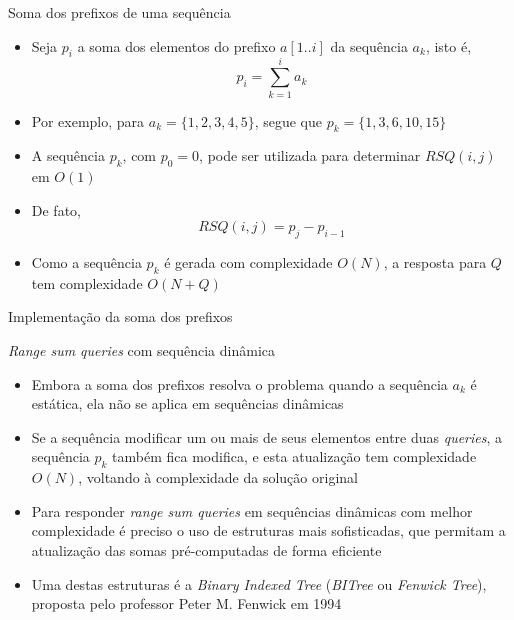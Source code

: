 \begin{frame}[fragile]{Soma dos prefixos de uma sequência}

    \begin{itemize}
        \item Seja $p_i$ a soma dos elementos do prefixo $a[1..i]$ da sequência $a_k$, isto é,
        \[
            p_i = \sum_{k = 1}^i a_k
        \]

        \item Por exemplo, para $a_k = \lbrace 1, 2, 3, 4, 5\rbrace$, segue que
            $p_k = \lbrace 1, 3, 6, 10, 15\rbrace$

        \item A sequência $p_k$, com $p_0 = 0$, pode ser utilizada para determinar $RSQ(i, j)$
            em $O(1)$

        \item De fato,
        \[
            RSQ(i, j) = p_j - p_{i - 1}
        \]

        \item Como a sequência $p_k$ é gerada com complexidade $O(N)$, a resposta para $Q$ tem
            complexidade $O(N + Q)$
    \end{itemize}

\end{frame}

\begin{frame}[fragile]{Implementação da soma dos prefixos}
\end{frame}

\begin{frame}[fragile]{\textit{Range sum queries} com sequência dinâmica}

    \begin{itemize}
        \item Embora a soma dos prefixos resolva o problema quando a sequência $a_k$ é 
            estática, ela não se aplica em sequências dinâmicas

        \item Se a sequência modificar um ou mais de seus elementos entre duas \textit{queries},
            a sequência $p_k$ também fica modifica, e esta atualização tem complexidade $O(N)$,
            voltando à complexidade da solução original

        \item Para responder \textit{range sum queries} em sequências dinâmicas com melhor
            complexidade
            é preciso o uso de estruturas mais sofisticadas, que permitam a atualização das
            somas pré-computadas de forma eficiente

        \item Uma destas estruturas é a \textit{Binary Indexed Tree} (\textit{BITree} ou 
            \textit{Fenwick Tree}), proposta pelo professor Peter M. Fenwick em 1994
    \end{itemize}

\end{frame}
